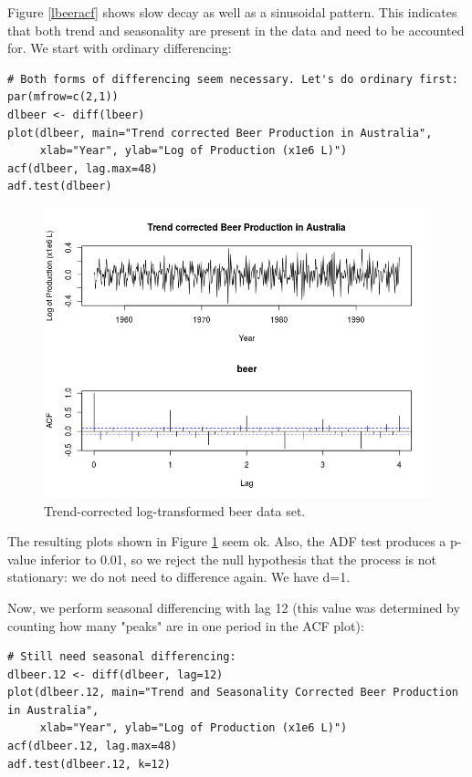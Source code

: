 \documentclass[]{article}
\begin{document}
Figure \ref{lbeeracf} shows slow decay as well as a sinusoidal pattern. This indicates that both trend and seasonality are present in the data and need to be accounted for. We start with ordinary differencing:

\begin{Verbatim}[frame=single]
# Both forms of differencing seem necessary. Let's do ordinary first:
par(mfrow=c(2,1))
dlbeer <- diff(lbeer)
plot(dlbeer, main="Trend corrected Beer Production in Australia",
     xlab="Year", ylab="Log of Production (x1e6 L)")
acf(dlbeer, lag.max=48)
adf.test(dlbeer)
\end{Verbatim}

\begin{figure}[!ht]
\centering
\includegraphics[width=.8\textwidth]{lbeertrend.png}
\caption{Trend-corrected log-transformed beer data set.}
\label{lbeertrend}
\end{figure}

The resulting plots shown in Figure \ref{lbeertrend} seem ok. Also, the ADF test produces a p-value inferior to 0.01, so we reject the null hypothesis that the process is not stationary: we do not need to difference again. We have d=1.

Now, we perform seasonal differencing with lag 12 (this value was determined by counting how many "peaks" are in one period in the ACF plot):
\begin{Verbatim}[frame=single]
# Still need seasonal differencing:
dlbeer.12 <- diff(dlbeer, lag=12)
plot(dlbeer.12, main="Trend and Seasonality Corrected Beer Production in Australia",
     xlab="Year", ylab="Log of Production (x1e6 L)")
acf(dlbeer.12, lag.max=48)
adf.test(dlbeer.12, k=12)
\end{Verbatim}
\end{document}
